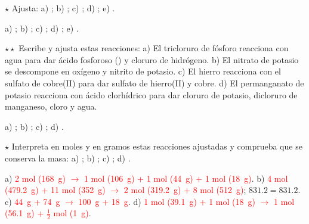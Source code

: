 \begin{exercise}
    \(\star\) Ajusta: a) ; b) ;
    c) ; d) ;
    e) .
    \begin{solu}
        a) \textcolor{red}{}; b) \textcolor{red}{};
        c) \textcolor{red}{}; d) \textcolor{red}{};
        e) \textcolor{red}{}.
    \end{solu}
\end{exercise}

\begin{exercise}
    \(\star\star\) Escribe y ajusta estas reacciones: a) El tricloruro de fósforo reacciona con agua para dar ácido fosforoso
    () y cloruro de hidrógeno. b) El nitrato de potasio se descompone en oxígeno y nitrito de potasio. c) El hierro
    reacciona con el sulfato de cobre(II) para dar sulfato de hierro(II) y cobre. d) El permanganato de potasio reacciona con ácido
    clorhídrico para dar cloruro de potasio, dicloruro de manganeso, cloro y agua.
    \begin{solu}
        a) \textcolor{red}{}; b) \textcolor{red}{};
        c) \textcolor{red}{}; d) \textcolor{red}{}.
    \end{solu}
\end{exercise}

\begin{exercise}
    \(\star\) Interpreta en moles y en gramos estas reacciones ajustadas y comprueba que se conserva la masa:
    a) ; b) ;
    c) ; d) .
    \begin{solu}
        a) \textcolor{red}{2 mol (\qty{168}{\gram}) \(\rightarrow\) 1 mol (\qty{106}{\gram}) + 1 mol (\qty{44}{\gram}) + 1 mol
        (\qty{18}{\gram})}. b) \textcolor{red}{4 mol (\qty{479.2}{\gram}) + 11 mol (\qty{352}{\gram}) \(\rightarrow\) 2 mol
        (\qty{319.2}{\gram}) + 8 mol (\qty{512}{\gram})}; \(\num{831.2} = \num{831.2}\). c) \textcolor{red}{\qty{44}{\gram} +
        \qty{74}{\gram} \(\rightarrow\) \qty{100}{\gram} + \qty{18}{\gram}}. d) \textcolor{red}{1 mol (\qty{39.1}{\gram}) + 1 mol
        (\qty{18}{\gram}) \(\rightarrow\) 1 mol (\qty{56.1}{\gram}) + \(\frac{1}{2}\) mol (\qty{1}{\gram})}.
    \end{solu}
\end{exercise}

